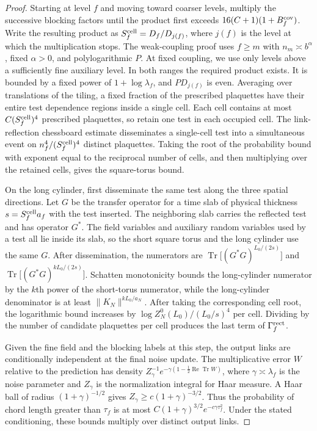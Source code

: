\documentclass[11pt,a4paper]{article}
\numberwithin{equation}{section}
\begin{document}
\begin{proof}
Starting at level \(f\) and moving toward coarser levels, multiply the successive blocking factors until the product first exceeds \(16(C+1)(1+B_f^{\rm cov})\). Write the resulting product as \(S_f^{\rm cell}=D_f/D_{j(f)}\), where \(j(f)\) is the level at which the multiplication stops. The weak-coupling proof uses \(f\ge m\) with \(n_m\asymp b^\alpha\), fixed \(\alpha>0\), and polylogarithmic \(P\). At fixed coupling, we use only levels above a sufficiently fine auxiliary level. In both ranges the required product exists. It is bounded by a fixed power of \(1+\log\lambda_f\), and \(PD_{j(f)}\) is even. Averaging over translations of the tiling, a fixed fraction of the prescribed plaquettes have their entire test dependence regions inside a single cell. Each cell contains at most \(C(S_f^{\rm cell})^4\) prescribed plaquettes, so retain one test in each occupied cell. The link-reflection chessboard estimate \cite[Eq.~(14.19)]{armstrong} disseminates a single-cell test into a simultaneous event on \(n_f^4/(S_f^{\rm cell})^4\) distinct plaquettes. Taking the root of the probability bound with exponent equal to the reciprocal number of cells, and then multiplying over the retained cells, gives the square-torus bound.

On the long cylinder, first disseminate the same test along the three spatial directions. Let \(G\) be the transfer operator for a time slab of physical thickness \(s=S_f^{\rm cell}a_f\) with the test inserted. The neighboring slab carries the reflected test and has operator \(G^*\). The field variables and auxiliary random variables used by a test all lie inside its slab, so the short square torus and the long cylinder use the same \(G\). After dissemination, the numerators are \(\operatorname{Tr}\bigl[(G^*G)^{L_0/(2s)}\bigr]\) and \(\operatorname{Tr}\bigl[(G^*G)^{kL_0/(2s)}\bigr]\). Schatten monotonicity bounds the long-cylinder numerator by the \(k\)th power of the short-torus numerator, while the long-cylinder denominator is at least \(\|K_N\|^{kL_0/a_N}\). After taking the corresponding cell root, the logarithmic bound increases by \(\log Z_N^0(L_0)/(L_0/s)^4\) per cell. Dividing by the number of candidate plaquettes per cell produces the last term of \(\Gamma_f^{\rm rect}\).

Given the fine field and the blocking labels at this step, the output links are conditionally independent at the final noise update. The multiplicative error \(W\) relative to the prediction has density \(Z_\gamma^{-1}e^{-\gamma(1-\tfrac12\operatorname{Re}\operatorname{Tr}W)}\), where \(\gamma\asymp\lambda_f\) is the noise parameter and \(Z_\gamma\) is the normalization integral for Haar measure. A Haar ball of radius \((1+\gamma)^{-1/2}\) gives \(Z_\gamma\ge c(1+\gamma)^{-3/2}\). Thus the probability of chord length greater than \(\tau_f\) is at most \(C(1+\gamma)^{3/2}e^{-c\gamma\tau_f^2}\). Under the stated conditioning, these bounds multiply over distinct output links.


\end{proof}
\end{document}
